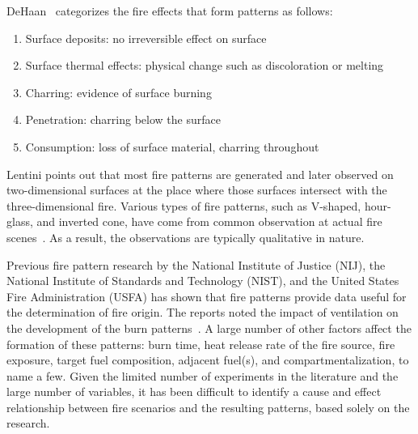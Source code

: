 \documentclass[twoside]{uocthesis}
\begin{document}
DeHaan~\cite{DeHaan:2012} categorizes the fire effects that form patterns as follows:
\begin{enumerate}
\item Surface deposits: no irreversible effect on surface
\item Surface thermal effects: physical change such as discoloration or melting
\item Charring: evidence of surface burning
\item Penetration: charring below the surface
\item Consumption: loss of surface material, charring throughout
\end{enumerate}

Lentini points out that most fire patterns are generated and later observed on two-dimensional surfaces at the place where those surfaces intersect with the three-dimensional fire. Various types of fire patterns, such as V-shaped, hour-glass, and inverted cone, have come from common observation at actual fire scenes~\cite{Lentini:2006}.  As a result, the observations are typically qualitative in nature.

Previous fire pattern research by the National Institute of Justice (NIJ), the National Institute of Standards and Technology (NIST), and the United States Fire Administration (USFA) has shown that fire patterns provide data useful for the determination of fire origin.  The reports noted the impact of ventilation on the development of the burn patterns~\cite{Shanley:1997,Putorti:1997}. A large number of other factors affect the formation of these patterns: burn time, heat release rate of the fire source, fire exposure, target fuel composition, adjacent fuel(s), and compartmentalization, to name a few. Given the limited number of experiments in the literature and the large number of variables, it has been difficult to identify a cause and effect relationship between fire scenarios and the resulting patterns, based solely on the research.  
\end{document}
